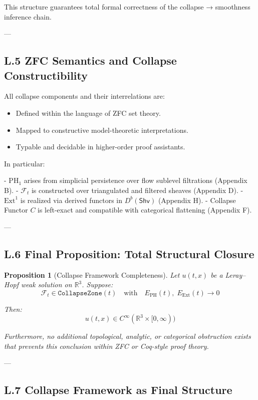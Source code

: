 \documentclass[11pt]{article}
\newtheorem{proposition}[theorem]{Proposition}
\begin{document}
This structure guarantees total formal correctness of the collapse → smoothness inference chain.

---

\subsection*{L.5 ZFC Semantics and Collapse Constructibility}

All collapse components and their interrelations are:

\begin{itemize}
  \item Defined within the language of ZFC set theory.
  \item Mapped to constructive model-theoretic interpretations.
  \item Typable and decidable in higher-order proof assistants.
\end{itemize}

In particular:

- \( \mathrm{PH}_1 \) arises from simplicial persistence over flow sublevel filtrations (Appendix B).
- \( \mathcal{F}_t \) is constructed over triangulated and filtered sheaves (Appendix D).
- \( \mathrm{Ext}^1 \) is realized via derived functors in \( D^b(\mathsf{Shv}) \) (Appendix H).
- Collapse Functor \( C \) is left-exact and compatible with categorical flattening (Appendix F).

---

\subsection*{L.6 Final Proposition: Total Structural Closure}

\begin{proposition}[Collapse Framework Completeness]
Let \( u(t,x) \) be a Leray–Hopf weak solution on \( \mathbb{R}^3 \).  
Suppose:
\[
\mathcal{F}_t \in \texttt{CollapseZone}(t)
\quad \text{with} \quad
E_{\mathrm{PH}}(t),\; E_{\mathrm{Ext}}(t) \to 0
\]

Then:
\[
u(t,x) \in C^\infty(\mathbb{R}^3 \times [0,\infty))
\]

Furthermore, no additional topological, analytic, or categorical obstruction exists  
that prevents this conclusion within ZFC or Coq-style proof theory.
\end{proposition}

---

\subsection*{L.7 Collapse Framework as Final Structure}
\end{document}
